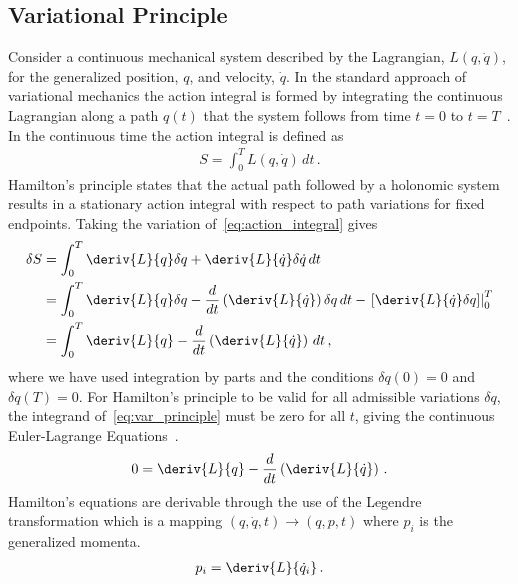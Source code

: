\subsection{Variational Principle}
Consider a continuous mechanical system described by the Lagrangian, \( L( q, \dot{q} ) \), for the generalized position, \( q\), and velocity, \( \dot{q} \).
In the standard approach of variational mechanics the action integral is formed by integrating the continuous Lagrangian along a path \( q(t) \) that the system follows from time \( t = 0 \) to \( t = T \)~\cite{greenwood1988}.
In the continuous time the action integral is defined as
\begin{align}\label{eq:action_integral}
	S = \int_{0}^T L\left( q, \dot{q}\right) \, dt \, .
\end{align}
Hamilton's principle states that the actual path followed by a holonomic system results in a stationary action integral with respect to path variations for fixed endpoints.
Taking the variation of~\cref{eq:action_integral} gives
\begin{subequations}\label{eq:var_principle}
\begin{align}
	\delta S &= \int_{0}^T \deriv{L}{q} \delta q + \deriv{L}{\dot{q}} \delta \dot{q} \, dt \\
		&= \int_{0}^T \deriv{L}{q} \delta q - \frac{d}{dt} \left( \deriv{L}{\dot{q}}\right) \delta q \, dt - \left. \left[ \deriv{L}{\dot{q}} \delta q\right] \right|_0^T \\
	&= \int_{0}^T \deriv{L}{q} - \frac{d}{dt} \left( \deriv{L}{\dot{q}}	\right) \, dt \, ,
\end{align}
\end{subequations} 
where we have used integration by parts and the conditions \( \delta q(0) = 0 \) and \( \delta q(T) = 0\).
For Hamilton's principle to be valid for all admissible variations \( \delta q \), the integrand of~\cref{eq:var_principle} must be zero for all \( t\), giving the continuous Euler-Lagrange Equations~\cite{lanczos1970}.
\begin{align}\label{eq:euler-lagrange}
	0 = \deriv{L}{q} - \frac{d}{dt} \left( \deriv{L}{\dot{q}} \right) \, .
\end{align}
Hamilton's equations are derivable through the use of the Legendre transformation which is a mapping \( \left( q, \dot{q},t\right) \rightarrow \left(q, p, t \right) \) where \( p_i\) is the generalized momenta.
\begin{align}\label{eq:legendre_transform}
	p_i = \deriv{L}{\dot{q}_i} \, .
\end{align}
